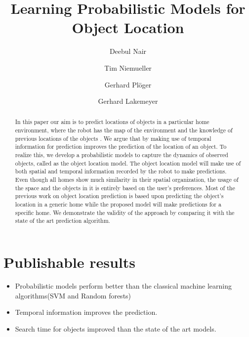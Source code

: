 \documentclass{llncs}
\begin{document}
\title{Learning Probabilistic Models for Object Location }
%
%
\author{Deebul Nair \and Tim Niemueller 
\and Gerhard Pl\"{o}ger  \and Gerhard Lakemeyer }
%
%
%
\maketitle              %

\begin{abstract}
In this paper our aim is to predict locations of objects in a particular home environment, where the robot has the map of the environment and the knowledge of previous locations of the objects . We argue that by making use of temporal information for prediction improves the prediction of the location of an object. To realize this, we develop a probabilistic models to capture the dynamics of observed objects, called as the object location model. The object location model will make use of both spatial and temporal information recorded by the robot to make predictions. Even though all homes show much similarity in their spatial organization, the usage of the space and the objects in it is entirely based on the user’s preferences. Most of the previous work on object location prediction is based upon predicting the object’s location in a generic home while the proposed model will make predictions for a specific home. We demonstrate the validity of the approach by comparing it with the state of the art prediction algorithm. 
\end{abstract}
%
\section{Publishable results}
\begin{itemize}
	\item Probabilistic models perform better than the classical machine learning algorithms(SVM and Random forests)
	\item Temporal information improves the prediction.
	\item Search time for objects improved than the state of the art models.
\end{itemize}
\end{document}
